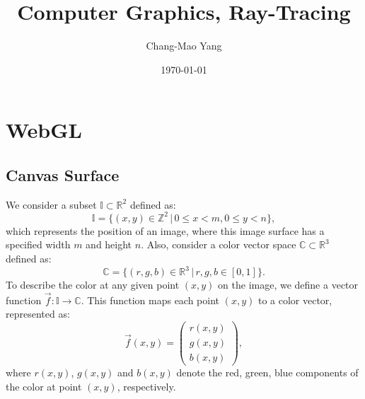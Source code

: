 \documentclass[a4paper, reprint, showkeys, nofootinbib,twoside]{revtex4-1}
\begin{document}
	\title{Computer Graphics, Ray-Tracing}
	\author{Chang-Mao Yang}
	\date{\today}
	
	\begin{abstract}
		\lipsum[1]
	\end{abstract}
	
	
	\maketitle
	\section{WebGL} \label{sec:webgl}
	\subsection{Canvas Surface}
		We consider a subset $\mathbb{I} \subset \mathbb{R}^2$ defined as:
		 \begin{equation}
		 \mathbb{I} = \{ (x,y)\in \mathbb{Z}^2\,|\, 0\leq x< m, 0\leq y< n\},
		 \end{equation}
		 which represents the position of an image, where this image surface has a specified width $m$ and height $n$. Also, consider a color vector space $\mathbb{C}\subset \mathbb{R}^3$ defined as:
		 \begin{equation}
		 \mathbb{C} = \{ (r,g,b)\in \mathbb{R}^3\,|\, r,g,b \in [0,1]\}.
		 \end{equation}
		 To describe the color at any given point $(x, y)$ on the image, we define a vector function $\vec{f} : \mathbb{I}\to \mathbb{C}$. This function maps each point \((x, y)\) to a color vector, represented as:
		\begin{equation}
		\vec{f}(x, y) = \begin{pmatrix} r(x, y) \\ g(x, y) \\ b(x, y)\end{pmatrix},
		\end{equation}
		where $r(x, y)$, $g(x, y)$ and $b(x, y)$ denote the red, green, blue components of the color at point $(x, y)$, respectively. 
		
\end{document}
